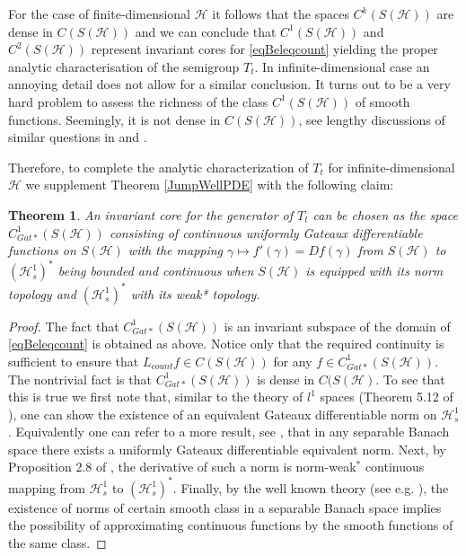 \documentclass[10pt,a4paper]{amsart}
\def\HC{\mathcal{H}}
\def\ga{\gamma}
\newtheorem{theorem}{Theorem}[section]
\begin{document}
For the case of finite-dimensional $\HC$ it follows that the spaces $C^k(S(\HC))$
are dense in $C(S(\HC))$ and we can conclude that $C^1(S(\HC))$ and $C^2(S(\HC))$ represent invariant
cores for \eqref{eqBeleqcount} yielding the proper analytic characterisation of the semigroup $T_t$.
In infinite-dimensional case an annoying detail does not allow for a similar conclusion.
It turns out to be a very hard problem to assess the richness of the class $C^1(S(\HC))$ of smooth functions.
Seemingly, it is not dense in $C(S(\HC))$, see lengthy discussions of similar questions in
\cite{Toolbox} and \cite{Phelps}.

Therefore, to complete the analytic characterization of  $T_t$ for infinite-dimensional $\HC$
we supplement Theorem \ref{JumpWellPDE} with the following claim:

\begin{theorem}
\label{JumpWellPDE1}
An invariant core for the generator of $T_t$ can be chosen as the space
$C^1_{Gat*}(S(\HC))$ consisting of continuous uniformly Gateaux differentiable functions on $S(\HC)$
with the mapping $\ga\mapsto f'(\ga)=Df(\ga)$
from $S(\HC)$ to $(\HC^1_s)^*$ being bounded and continuous
when $S(\HC)$ is equipped with its norm topology
and $(\HC^1_s)^*$ with its weak* topology.
\end{theorem}

\begin{proof}
The fact that $C^1_{Gat*}(S(\HC))$ is an invariant subspace of the domain of \eqref{eqBeleqcount}
is obtained as above. Notice only that the required continuity is sufficient to ensure that
$L_{count}f \in C(S(\HC))$ for any $f\in C^1_{Gat*}(S(\HC))$. The nontrivial fact is that
$C^1_{Gat*}(S(\HC))$ is dense in $C(S(\HC)$. To see that this is true we first note that,
similar to the theory of $l^1$ spaces (Theorem 5.12 of \cite{Phelps}), one can show the existence
of an equivalent Gateaux differentiable norm on $\HC^1_s$. Equivalently one can refer to a more
result, see \cite{Hayek}, that in any separable Banach space there exists a uniformly
Gateaux differentiable equivalent norm.
Next, by Proposition 2.8 of \cite{Phelps}, the derivative of such a norm is norm-weak${}^*$
continuous mapping from $\HC^1_s$ to $(\HC^1_s)^*$. Finally, by the well known theory
(see e.g. \cite{Eells}), the existence of norms of certain smooth class in a separable
Banach space implies the possibility of approximating continuous functions by the
smooth functions of the same class.
\end{proof}
\end{document}
